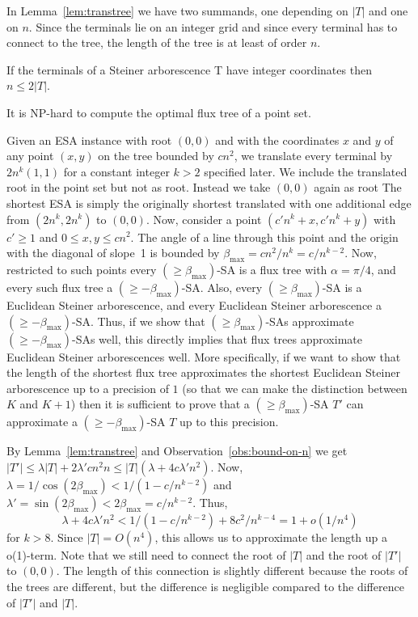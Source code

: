 \documentclass{journalA4}
\begin{document}
\noindent
In Lemma~\ref{lem:transtree} we have two summands, one depending on $|T|$ and one on $n$. Since the terminals lie on an integer grid and since every terminal has to connect to the tree, the length of the tree is at least of order $n$.
\begin{obs}\label{obs:bound-on-n}
If the terminals of a Steiner arborescence T have integer coordinates then $n \leq 2|T|$.
\end{obs}

\begin{theorem}\label{thm:nphard-flux}
It is NP-hard to compute the optimal flux tree of a point set.
\end{theorem}
Given an ESA instance with root $(0,0)$ and with the coordinates $x$ and $y$ of any point $(x,y)$ on the tree bounded by $c n^2$, we translate every terminal by $2 n^k (1,1)$ for a constant integer $k>2$ specified later. We include the translated root in the point set but not as root. Instead we take $(0,0)$ again as root The shortest ESA is simply the originally shortest translated with one additional edge from $(2 n^k,2 n^k)$ to $(0,0)$. Now, consider a point $(c' n^k + x, c' n^k + y)$ with $c'\geq 1$ and $0\leq x,y \leq c n^2$. The angle of a line through this point and the origin with the diagonal of slope~1 is bounded by $\beta_{\max} = c n^2/n^k = c/n^{k-2}$. Now, restricted to such points every $(\geq \beta_{\max})$-SA is a flux tree with $\alpha = \pi/4$, and every such flux tree a $(\geq -\beta_{\max})$-SA. Also, every $(\geq \beta_{\max})$-SA is a Euclidean Steiner arborescence, and every Euclidean Steiner arborescence a $(\geq  -\beta_{\max})$-SA. Thus, if we show that $(\geq \beta_{\max})$-SAs approximate $(\geq  -\beta_{\max})$-SAs well, this directly implies that flux trees approximate Euclidean Steiner arborescences well. More specifically, if we want to show that the length of the shortest flux tree approximates the shortest Euclidean Steiner arborescence up to a precision of $1$ (so that we can make the distinction between $K$ and $K+1$) then it is sufficient to prove that a $(\geq \beta_{\max})$-SA $T'$ can approximate a $(\geq  -\beta_{\max})$-SA $T$ up to this precision.

By Lemma~\ref{lem:transtree} and Observation~\ref{obs:bound-on-n} we get $|T'| \leq \lambda |T| + 2 \lambda' c n^2 n \leq |T| (\lambda + 4 c \lambda' n^2)$. Now, $\lambda = 1/ \cos (2 \beta_{\max}) < 1 / (1 - c/n^{k-2})$ and $\lambda' = \sin (2\beta_{\max}) < 2\beta_{\max} = c/n^{k-2}$. Thus,
\[
\lambda + 4 c \lambda' n^2 < 1 / (1 - c/n^{k-2}) + 8c^2 /n^{k-4} = 1 + o(1/n^4)
\]
for $k>8$. Since $|T| = O(n^4)$, this allows us to approximate the length up a o(1)-term. Note that we still need to connect the root of $|T|$ and the root of $|T'|$ to $(0,0)$. The length of this connection is slightly different because the roots of the trees are different, but the difference is negligible compared to the difference of $|T'|$ and $|T|$. \hfill\QED
\medskip
\end{document}
